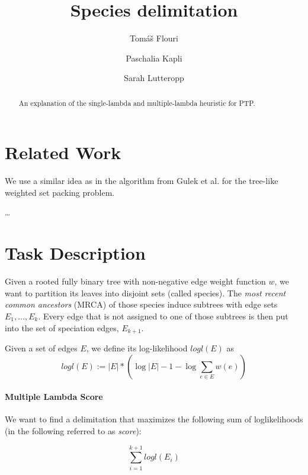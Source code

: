 \documentclass{llncs}
\begin{document}
\title{Species delimitation}


\author{Tom\'{a}\v{s} Flouri \and Paschalia Kapli \and Sarah Lutteropp}

\maketitle

\begin{abstract}
An explanation of the single-lambda and multiple-lambda heuristic for PTP.\@
\end{abstract}

\section{Related Work}

We use a similar idea as in the algorithm from Gulek et al.\cite{Gulek:2010:DPA:1838770.1839019} for the tree-like weighted set packing problem.

\ldots

\section{Task Description}

Given a rooted fully binary tree with non-negative edge weight function $w$, we want to partition its leaves into disjoint sets (called species). The \emph{most recent common ancestors} (MRCA) of those species induce subtrees with edge sets $E_1, \ldots, E_{k}$. Every edge that is not assigned to one of those subtrees is then put into the set of speciation edges, $E_{k+1}$.

Given a set of edges $E$, we define its log-likelihood $logl(E)$ as
$$logl(E) := |E| * (\log{|E|} - 1 - \log{\sum_{e \in E} w(e)})$$

\paragraph{Multiple Lambda Score}

We want to find a delimitation that maximizes the following sum of loglikelihoods (in the following referred to as \emph{score}):

$$\sum_{i=1}^{k+1}{logl(E_i)}$$
\end{document}
